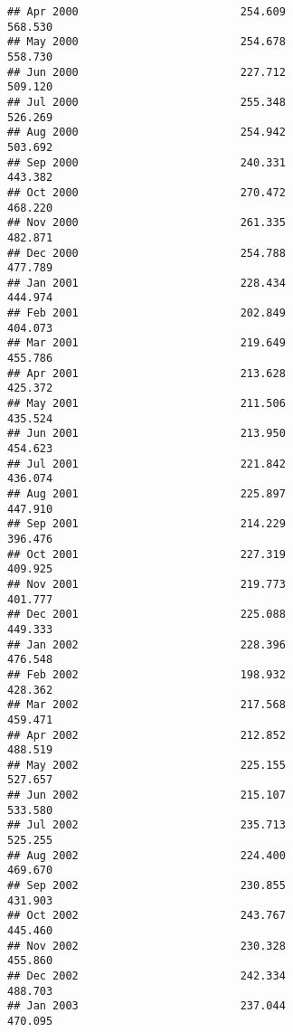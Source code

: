\documentclass[
]{article}
\begin{document}
\begin{verbatim}
## Apr 2000                         254.609                           568.530
## May 2000                         254.678                           558.730
## Jun 2000                         227.712                           509.120
## Jul 2000                         255.348                           526.269
## Aug 2000                         254.942                           503.692
## Sep 2000                         240.331                           443.382
## Oct 2000                         270.472                           468.220
## Nov 2000                         261.335                           482.871
## Dec 2000                         254.788                           477.789
## Jan 2001                         228.434                           444.974
## Feb 2001                         202.849                           404.073
## Mar 2001                         219.649                           455.786
## Apr 2001                         213.628                           425.372
## May 2001                         211.506                           435.524
## Jun 2001                         213.950                           454.623
## Jul 2001                         221.842                           436.074
## Aug 2001                         225.897                           447.910
## Sep 2001                         214.229                           396.476
## Oct 2001                         227.319                           409.925
## Nov 2001                         219.773                           401.777
## Dec 2001                         225.088                           449.333
## Jan 2002                         228.396                           476.548
## Feb 2002                         198.932                           428.362
## Mar 2002                         217.568                           459.471
## Apr 2002                         212.852                           488.519
## May 2002                         225.155                           527.657
## Jun 2002                         215.107                           533.580
## Jul 2002                         235.713                           525.255
## Aug 2002                         224.400                           469.670
## Sep 2002                         230.855                           431.903
## Oct 2002                         243.767                           445.460
## Nov 2002                         230.328                           455.860
## Dec 2002                         242.334                           488.703
## Jan 2003                         237.044                           470.095

\end{verbatim}
\end{document}
